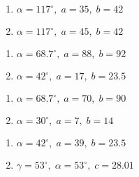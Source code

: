\begin{multicols}{2} 

\begin{enumerate}

\setcounter{enumi}{\value{HW}}

\item $\alpha = 117^{\circ}, \; a = 35, \; b = 42$
\item $\alpha = 117^{\circ}, \; a = 45, \; b = 42$

\setcounter{HW}{\value{enumi}}

\end{enumerate}

\end{multicols}

\begin{multicols}{2} 

\begin{enumerate}

\setcounter{enumi}{\value{HW}}

\item $\alpha = 68.7^{\circ}, \; a = 88, \; b = 92$
\item $\alpha = 42^{\circ}, \; a = 17, \; b = 23.5$

\setcounter{HW}{\value{enumi}}

\end{enumerate}

\end{multicols}

\begin{multicols}{2} 

\begin{enumerate}

\setcounter{enumi}{\value{HW}}

\item $\alpha = 68.7^{\circ}, \; a = 70, \; b = 90$
\item $\alpha = 30^{\circ}, \; a = 7, \; b = 14$

\setcounter{HW}{\value{enumi}}

\end{enumerate}

\end{multicols}

\begin{multicols}{2} 

\begin{enumerate}

\setcounter{enumi}{\value{HW}}

\item $\alpha = 42^{\circ}, \; a = 39, \; b = 23.5$
\item $\gamma = 53^{\circ}, \; \alpha = 53^{\circ}, \; c = 28.01$ \label{secondarea}

\setcounter{HW}{\value{enumi}}

\end{enumerate}

\end{multicols}

